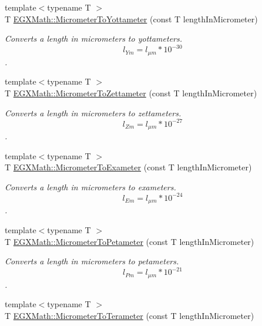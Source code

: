 \begin{DoxyCompactItemize}
{\footnotesize template$<$typename T $>$ }\\T \mbox{\hyperlink{group___e_g_x_math-_conversions-_length_conversions-_s_i-_micrometer-_s_i_gaeea13656a8abffb34144175cba3b9afc}{E\+G\+X\+Math\+::\+Micrometer\+To\+Yottameter}} (const T length\+In\+Micrometer)
\begin{DoxyCompactList}\small\item\em Converts a length in micrometers to yottameters. \[ l_{Ym}=l_{\mu m} * 10^{-30} \]. \end{DoxyCompactList}\item 
{\footnotesize template$<$typename T $>$ }\\T \mbox{\hyperlink{group___e_g_x_math-_conversions-_length_conversions-_s_i-_micrometer-_s_i_ga689cb2982c4b1602ccee247011d017d8}{E\+G\+X\+Math\+::\+Micrometer\+To\+Zettameter}} (const T length\+In\+Micrometer)
\begin{DoxyCompactList}\small\item\em Converts a length in micrometers to zettameters. \[ l_{Zm}=l_{\mu m} * 10^{-27} \]. \end{DoxyCompactList}\item 
{\footnotesize template$<$typename T $>$ }\\T \mbox{\hyperlink{group___e_g_x_math-_conversions-_length_conversions-_s_i-_micrometer-_s_i_ga0801b93a011bf0495bb3c96be2b47734}{E\+G\+X\+Math\+::\+Micrometer\+To\+Exameter}} (const T length\+In\+Micrometer)
\begin{DoxyCompactList}\small\item\em Converts a length in micrometers to exameters. \[ l_{Em}=l_{\mu m} * 10^{-24} \]. \end{DoxyCompactList}\item 
{\footnotesize template$<$typename T $>$ }\\T \mbox{\hyperlink{group___e_g_x_math-_conversions-_length_conversions-_s_i-_micrometer-_s_i_gaf151d8277712dbb886992fdd357d1c9d}{E\+G\+X\+Math\+::\+Micrometer\+To\+Petameter}} (const T length\+In\+Micrometer)
\begin{DoxyCompactList}\small\item\em Converts a length in micrometers to petameters. \[ l_{Pm}=l_{\mu m} * 10^{-21} \]. \end{DoxyCompactList}\item 
{\footnotesize template$<$typename T $>$ }\\T \mbox{\hyperlink{group___e_g_x_math-_conversions-_length_conversions-_s_i-_micrometer-_s_i_ga1f22962ca08a1b8970abc277530d07a3}{E\+G\+X\+Math\+::\+Micrometer\+To\+Terameter}} (const T length\+In\+Micrometer)

\end{DoxyCompactItemize}
